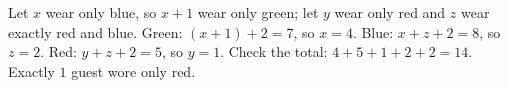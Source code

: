 Let \(x\) wear only blue, so \(x+1\) wear only green; let \(y\) wear only red and \(z\) wear exactly red and blue. Green: \((x+1)+2=7\), so \(x=4\). Blue: \(x+z+2=8\), so \(z=2\). Red: \(y+z+2=5\), so \(y=1\). Check the total: \(4+5+1+2+2=14\). Exactly \(\boxed{1}\) guest wore only red.
